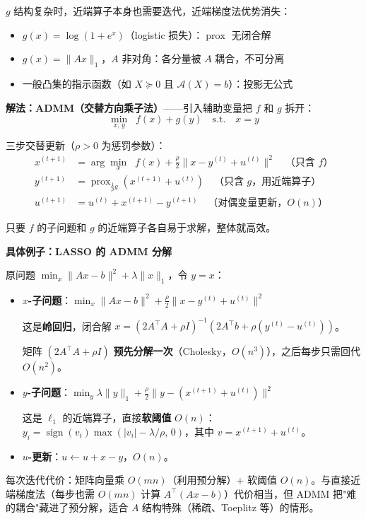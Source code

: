 \documentclass[12pt, a4paper]{ctexart}
\begin{document}
\begin{blackboard}

$g$ 结构复杂时，近端算子本身也需要迭代，近端梯度法优势消失：

\begin{itemize}
    \item $g(x) = \log(1 + e^x)$（logistic 损失）：$\operatorname{prox}$ 无闭合解
    \item $g(x) = \|Ax\|_1$，$A$ 非对角：各分量被 $A$ 耦合，不可分离
    \item 一般凸集的指示函数（如 $X \succeq 0$ 且 $\mathcal{A}(X) = b$）：投影无公式
\end{itemize}

\textbf{解法：ADMM（交替方向乘子法）}——引入辅助变量把 $f$ 和 $g$ 拆开：
\[
\min_{x,\, y} \;\; f(x) + g(y) \quad \text{s.t.} \quad x = y
\]

三步交替更新（$\rho > 0$ 为惩罚参数）：
\begin{align*}
x^{(t+1)} &= \arg\min_x \;\; f(x) + \frac{\rho}{2}\|x - y^{(t)} + u^{(t)}\|^2 \quad \text{（只含 $f$）}\\
y^{(t+1)} &= \operatorname{prox}_{\frac{1}{\rho}g}\!\left(x^{(t+1)} + u^{(t)}\right) \quad \text{（只含 $g$，用近端算子）}\\
u^{(t+1)} &= u^{(t)} + x^{(t+1)} - y^{(t+1)} \quad \text{（对偶变量更新，$O(n)$）}
\end{align*}

只要 $f$ 的子问题和 $g$ 的近端算子各自易于求解，整体就高效。

\textbf{具体例子：LASSO 的 ADMM 分解}

原问题 $\min_x \|Ax-b\|^2 + \lambda\|x\|_1$，令 $y = x$：

\begin{itemize}
    \item \textbf{$x$-子问题}：$\min_x \|Ax-b\|^2 + \frac{\rho}{2}\|x - y^{(t)} + u^{(t)}\|^2$

    这是\textbf{岭回归}，闭合解 $x = (2A^\top A + \rho I)^{-1}(2A^\top b + \rho(y^{(t)} - u^{(t)}))$。

    矩阵 $(2A^\top A + \rho I)$ \textbf{预先分解一次}（Cholesky，$O(n^3)$），之后每步只需回代 $O(n^2)$。

    \item \textbf{$y$-子问题}：$\min_y \lambda\|y\|_1 + \frac{\rho}{2}\|y - (x^{(t+1)} + u^{(t)})\|^2$

    这是 $\ell_1$ 的近端算子，直接\textbf{软阈值} $O(n)$：$y_i = \operatorname{sign}(v_i)\max(|v_i| - \lambda/\rho,\, 0)$，其中 $v = x^{(t+1)} + u^{(t)}$。

    \item \textbf{$u$-更新}：$u \leftarrow u + x - y$，$O(n)$。
\end{itemize}

每次迭代代价：矩阵向量乘 $O(mn)$（利用预分解）+ 软阈值 $O(n)$。与直接近端梯度法（每步也需 $O(mn)$ 计算 $A^\top(Ax-b)$）代价相当，但 ADMM 把"难的耦合"藏进了预分解，适合 $A$ 结构特殊（稀疏、Toeplitz 等）的情形。

\end{blackboard}
\end{document}
